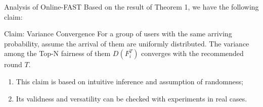 \begin{frame}{Analysis of Online-FAST}
Based on the result of Theorem 1,
we have the following claim:
\begin{block}{Claim: Variance Convergence}
For a group of users with the same arriving probability, assume the arrival of them are uniformly distributed. The variance among the Top-N fairness of them $D\left(F_{i}^{T}\right)$ converges with the recommended round $T$.
\end{block}
\begin{enumerate}
    \item This claim is based on intuitive inference and assumption of randomness;
    \item Its validness and versatility can be checked with experiments in real cases.
\end{enumerate}
\end{frame}


